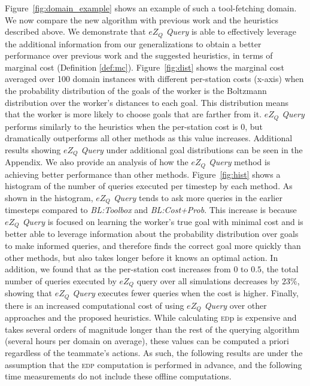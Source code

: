 \documentclass[letterpaper]{article}
\begin{document}
Figure~\ref{fig:domain_example} shows an example of such a tool-fetching domain. We now compare the new algorithm with previous work and the heuristics described above. We demonstrate that \emph{$eZ_Q$ Query} is able to effectively leverage the additional information from our generalizations to obtain a better performance over previous work and the suggested heuristics, in terms of marginal cost (Definition \ref{def:mc}).  Figure~\ref{fig:dist} shows the marginal cost averaged over 100 domain instances with different per-station costs (x-axis) when the probability distribution of the goals of the worker is the Boltzmann distribution over the worker's distances to each goal. This distribution means that the worker is more likely to choose goals that are farther from it. \emph{$eZ_Q$ Query} performs similarly to the heuristics when the per-station cost is 0, but dramatically outperforms all other methods as this value increases.
Additional results showing \emph{$eZ_Q$ Query} under additional goal distributions can be seen in the Appendix.  We also provide an analysis of how the \emph{$eZ_Q$ Query} method is achieving better performance than other methods. Figure~\ref{fig:hist} shows a histogram of the number of queries executed per timestep by each method. As shown in the histogram, \emph{$eZ_Q$ Query} tends to ask more queries in the earlier timesteps compared to \emph{BL:Toolbox} and \emph{BL:Cost+Prob}. This increase is because \emph{$eZ_Q$ Query} is focused on learning the worker's true goal with minimal cost and is better able to leverage information about the probability distribution over goals to make informed queries, and therefore finds the correct goal more quickly than other methods, but also takes longer before it knows an optimal action.
In addition, we found that as the per-station cost increases from $0$ to $0.5$, the total number of queries executed by $eZ_Q$ query over all simulations decreases by $23\%$, showing that \emph{$eZ_Q$ Query} executes fewer queries when the cost is higher.  Finally, there is an increased computational cost of using \emph{$eZ_Q$ Query} over other approaches and the proposed heuristics. While calculating \textsc{ed}p is expensive and takes several orders of magnitude longer than the rest of the querying algorithm (several hours per domain on average), these values
can be computed a priori regardless of the teammate's actions. As such, the following results are under the assumption that the \textsc{edp} computation is performed in advance, and the following time measurements do not include these offline computations. %
\end{document}
